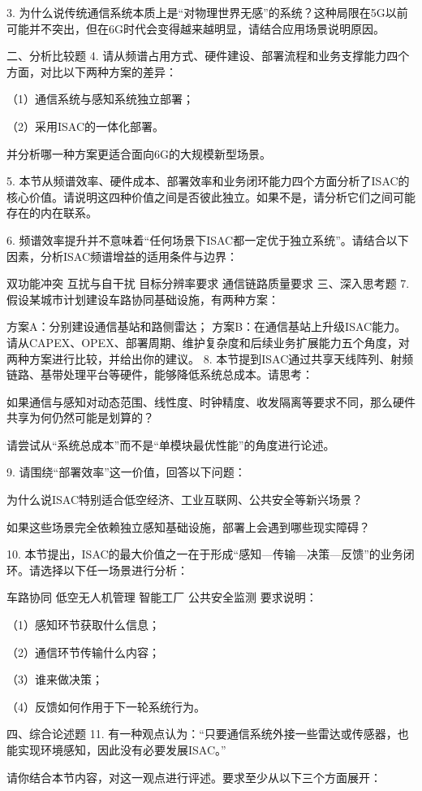 3. 为什么说传统通信系统本质上是“对物理世界无感”的系统？这种局限在5G以前可能并不突出，但在6G时代会变得越来越明显，请结合应用场景说明原因。

二、分析比较题
4. 请从频谱占用方式、硬件建设、部署流程和业务支撑能力四个方面，对比以下两种方案的差异：

（1）通信系统与感知系统独立部署；

（2）采用ISAC的一体化部署。

并分析哪一种方案更适合面向6G的大规模新型场景。

5. 本节从频谱效率、硬件成本、部署效率和业务闭环能力四个方面分析了ISAC的核心价值。请说明这四种价值之间是否彼此独立。如果不是，请分析它们之间可能存在的内在联系。

6. 频谱效率提升并不意味着“任何场景下ISAC都一定优于独立系统”。请结合以下因素，分析ISAC频谱增益的适用条件与边界：

双功能冲突
互扰与自干扰
目标分辨率要求
通信链路质量要求
三、深入思考题
7. 假设某城市计划建设车路协同基础设施，有两种方案：

方案A：分别建设通信基站和路侧雷达；
方案B：在通信基站上升级ISAC能力。
请从CAPEX、OPEX、部署周期、维护复杂度和后续业务扩展能力五个角度，对两种方案进行比较，并给出你的建议。
8. 本节提到ISAC通过共享天线阵列、射频链路、基带处理平台等硬件，能够降低系统总成本。请思考：

如果通信与感知对动态范围、线性度、时钟精度、收发隔离等要求不同，那么硬件共享为何仍然可能是划算的？

请尝试从“系统总成本”而不是“单模块最优性能”的角度进行论述。

9. 请围绕“部署效率”这一价值，回答以下问题：

为什么说ISAC特别适合低空经济、工业互联网、公共安全等新兴场景？

如果这些场景完全依赖独立感知基础设施，部署上会遇到哪些现实障碍？

10. 本节提出，ISAC的最大价值之一在于形成“感知—传输—决策—反馈”的业务闭环。请选择以下任一场景进行分析：

车路协同
低空无人机管理
智能工厂
公共安全监测
要求说明：

（1）感知环节获取什么信息；

（2）通信环节传输什么内容；

（3）谁来做决策；

（4）反馈如何作用于下一轮系统行为。

四、综合论述题
11. 有一种观点认为：“只要通信系统外接一些雷达或传感器，也能实现环境感知，因此没有必要发展ISAC。”

请你结合本节内容，对这一观点进行评述。要求至少从以下三个方面展开：

